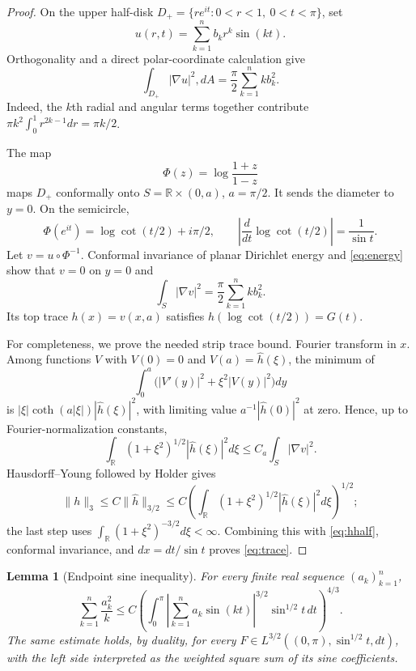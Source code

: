 \documentclass[11pt]{article}
\newtheorem{lemma}{Lemma}
\newcommand{\R}{\mathbb R}
\begin{document}
\begin{proof}
On the upper half-disk
$D_+=\{re^{it}:0<r<1,\ 0<t<\pi\}$, set
\[
 u(r,t)=\sum_{k=1}^n b_k r^k\sin(kt).
\]
Orthogonality and a direct polar-coordinate calculation give
\begin{equation}\label{eq:energy}
 \int_{D_+}|\nabla u|^2,dA=\frac\pi2\sum_{k=1}^n k b_k^2.
\end{equation}
Indeed, the $k$th radial and angular terms together contribute
$\pi k^2\int_0^1r^{2k-1}dr=\pi k/2$.

The map
\[
 \Phi(z)=\log\frac{1+z}{1-z}
\]
maps $D_+$ conformally onto
$S=\R\times(0,a)$, $a=\pi/2$.  It sends the diameter to $y=0$.  On the
semicircle,
\[
 \Phi(e^{it})=\log\cot(t/2)+i\pi/2,
 \qquad
 \left|\frac{d}{dt}\log\cot(t/2)\right|=\frac1{\sin t}.
\]
Let $v=u\circ\Phi^{-1}$.  Conformal invariance of planar Dirichlet energy
and \eqref{eq:energy} show that $v=0$ on $y=0$ and
\[
 \int_S|\nabla v|^2=\frac\pi2\sum_{k=1}^n k b_k^2.
\]
Its top trace $h(x)=v(x,a)$ satisfies $h(\log\cot(t/2))=G(t)$.

For completeness, we prove the needed strip trace bound. Fourier transform
in $x$.  Among functions $V$ with $V(0)=0$ and $V(a)=\widehat h(\xi)$, the
minimum of
\[
 \int_0^a\bigl(|V'(y)|^2+\xi^2|V(y)|^2\bigr)dy
\]
is
$|\xi|\coth(a|\xi|)|\widehat h(\xi)|^2$, with limiting value
$a^{-1}|\widehat h(0)|^2$ at zero.  Hence, up to Fourier-normalization
constants,
\begin{equation}\label{eq:hhalf}
 \int_\R(1+\xi^2)^{1/2}|\widehat h(\xi)|^2d\xi
 \leq C_a\int_S|\nabla v|^2.
\end{equation}
Hausdorff--Young followed by Holder gives
\[
 \|h\|_3\leq C\|\widehat h\|_{3/2}
 \leq C\left(\int_\R(1+\xi^2)^{1/2}
 |\widehat h(\xi)|^2d\xi\right)^{1/2};
\]
the last step uses
$\int_\R(1+\xi^2)^{-3/2}d\xi<\infty$.
Combining this with \eqref{eq:hhalf}, conformal invariance, and
$dx=dt/\sin t$ proves \eqref{eq:trace}.
\end{proof}

\begin{lemma}[Endpoint sine inequality]\label{lem:sine}
For every finite real sequence $(a_k)_{k=1}^n$,
\begin{equation}\label{eq:sine}
 \sum_{k=1}^n\frac{a_k^2}{k}
 \leq C
 \left(\int_0^\pi\left|\sum_{k=1}^n a_k\sin(kt)\right|^{3/2}
 \sin^{1/2}t\,dt\right)^{4/3}.
\end{equation}
The same estimate holds, by duality, for every
$F\in L^{3/2}((0,\pi),\sin^{1/2}t,dt)$, with the left side interpreted as
the weighted square sum of its sine coefficients.
\end{lemma}
\end{document}
